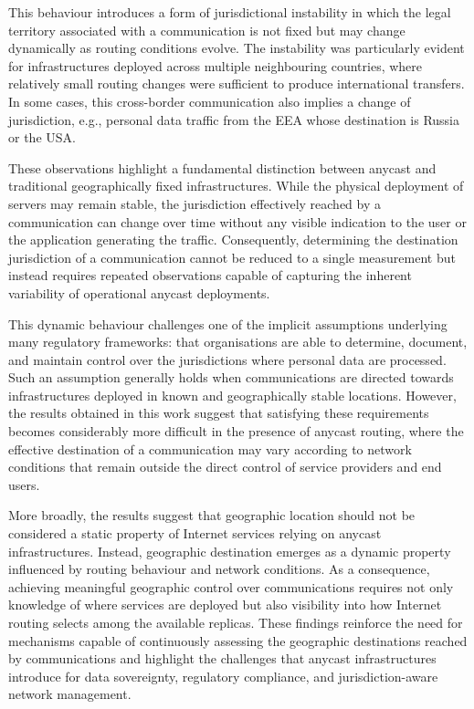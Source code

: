 This behaviour introduces a form of jurisdictional instability in which the legal territory associated with a communication is not fixed but may change dynamically as routing conditions evolve. The instability was particularly evident for infrastructures deployed across multiple neighbouring countries, where relatively small routing changes were sufficient to produce international transfers. In some cases, this cross-border communication also implies a change of jurisdiction, e.g., personal data traffic from the EEA whose destination is Russia or the USA.

These observations highlight a fundamental distinction between anycast and traditional geographically fixed infrastructures. While the physical deployment of servers may remain stable, the jurisdiction effectively reached by a communication can change over time without any visible indication to the user or the application generating the traffic. Consequently, determining the destination jurisdiction of a communication cannot be reduced to a single measurement but instead requires repeated observations capable of capturing the inherent variability of operational anycast deployments.

This dynamic behaviour challenges one of the implicit assumptions underlying many regulatory frameworks: that organisations are able to determine, document, and maintain control over the jurisdictions where personal data are processed. Such an assumption generally holds when communications are directed towards infrastructures deployed in known and geographically stable locations. However, the results obtained in this work suggest that satisfying these requirements becomes considerably more difficult in the presence of anycast routing, where the effective destination of a communication may vary according to network conditions that remain outside the direct control of service providers and end users.

More broadly, the results suggest that geographic location should not be considered a static property of Internet services relying on anycast infrastructures. Instead, geographic destination emerges as a dynamic property influenced by routing behaviour and network conditions. As a consequence, achieving meaningful geographic control over communications requires not only knowledge of where services are deployed but also visibility into how Internet routing selects among the available replicas. These findings reinforce the need for mechanisms capable of continuously assessing the geographic destinations reached by communications and highlight the challenges that anycast infrastructures introduce for data sovereignty, regulatory compliance, and jurisdiction-aware network management.
